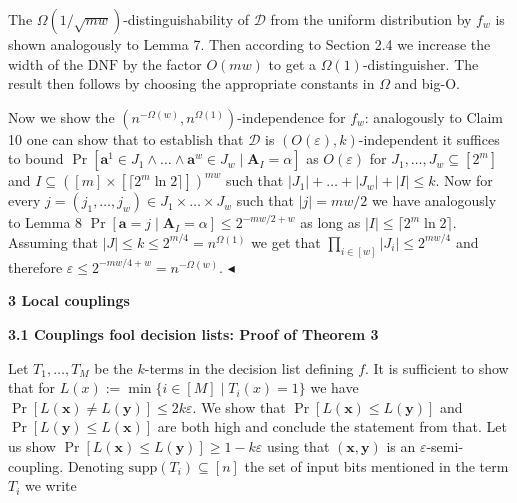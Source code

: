 \documentclass[10pt,a4paper]{article}
\begin{document}
The $\Omega(1/\sqrt{mw})$-distinguishability of $\mathcal{D}$ from the uniform distribution by $f_{w}$ is
shown analogously to Lemma 7. Then according to Section 2.4
we increase the width of the $\mathrm{DNF}$ by the factor $O(mw)$ to get a $\Omega(1)$-distinguisher. The
result then follows by choosing the appropriate constants in $\Omega$ and big-O.\par




Now we show the $(n^{-\Omega(w)},n^{\Omega(1)})$-independence for $f_{w}$: analogously to
Claim 10 one can show that to establish that $\mathcal{D}$ is $(O(\varepsilon),k)$-independent it suffices to bound $\Pr[\bm{a}^{1}\in J_{1}\land\dots\land\bm{a}^{w}\in J_{w}\mid\bm{A}_{I}=\alpha]$ as $O(\varepsilon)$ for $J_{1},\dots,J_{w}\subseteq[2^{m}]$ and $I\subseteq([m]\times[\lceil 2^{m}\ln 2\rceil])^{mw}$ such that $|J_{1}|+\dots+|J_{w}|+|I|\leq k$. Now for every $j=(j_{1},\dots,j_{w})\in J_{1}\times\dots\times J_{w}$ such that $|j|=mw/2$ we have analogously to
Lemma 8 $\Pr[\bm{a}=j\mid\bm{A}_{I}=\alpha]\leq 2^{-mw/2+w}$ as long as $|I|\leq\lceil 2^{m}\ln 2\rceil$. Assuming that $|J|\leq k\leq 2^{m/4}=n^{\Omega(1)}$ we get that $\prod_{i\in[w]}|J_{i}|\leq 2^{mw/4}$ and therefore $\varepsilon\leq 2^{-mw/4+w}=n^{-\Omega(w)}$.
$\blacktriangleleft$\par







\par\medskip\noindent\textbf{
3 Local couplings}\par




\par\medskip\noindent\textbf{
3.1 Couplings fool decision lists: Proof of Theorem 3
}\par




Let $T_{1},\dots,T_{M}$ be the $k$-terms in the decision list defining $f$. It is sufficient to show that for $L(x):=\min\{i\in[M]\mid T_{i}(x)=1\}$ we have $\Pr[L(\bm{x})\neq L(\bm{y})]\leq 2k\varepsilon$.
We show that $\Pr[L(\bm{x})\leq L(\bm{y})]$ and $\Pr[L(\bm{y})\leq L(\bm{x})]$ are both high and conclude the statement from that. Let us show $\Pr[L(\bm{x})\leq L(\bm{y})]\geq 1-k\varepsilon$ using that $(\bm{x},\bm{y})$ is an $\varepsilon$-semi-coupling. Denoting $\mathrm{supp}(T_{i})\subseteq[n]$ the set of input bits mentioned in the term $T_{i}$ we write\par
\end{document}
